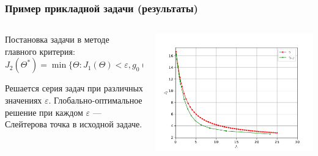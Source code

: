 \documentclass[aspectratio=1610]{beamer}
\begin{document}
\begin{frame}
  \frametitle{Пример прикладной задачи (результаты)}
  \begin{columns}
    \begin{column}{0.5\textwidth}

      Постановка задачи в методе главного критерия:
      \begin{displaymath}
        J_2(\Theta^*)=\min\{\Theta: J_1(\Theta) < \varepsilon,g_0(\Theta)\leqslant 0\}
      \end{displaymath}

      Решается серия задач при различных значениях \(\varepsilon\). Глобально-оптимальное решение
      при каждом \(\varepsilon\) --- Слейтерова точка в исходной задаче.

    \end{column}
    \begin{column}{0.5\textwidth}
      \centerline{\includegraphics[width=1.2\textwidth]{solution.pdf}}
    \end{column}
  \end{columns}

\end{frame}
\end{document}
